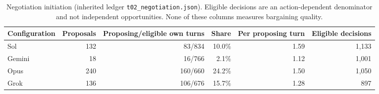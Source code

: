 \begin{table}[htbp]
\centering\small
\begin{tabular}{@{}lrrrrr@{}}\toprule
Configuration & Proposals & Proposing/eligible own turns & Share & Per proposing turn & Eligible decisions\\\midrule
Sol & 132 & 83/834 & 10.0\% & 1.59 & 1,133\\
Gemini & 18 & 16/766 & 2.1\% & 1.12 & 1,001\\
Opus & 240 & 160/660 & 24.2\% & 1.50 & 1,050\\
Grok & 136 & 106/676 & 15.7\% & 1.28 & 897\\
\bottomrule\end{tabular}
\caption{Negotiation initiation (inherited ledger \texttt{t02\_negotiation.json}). Eligible decisions are an action-dependent denominator and not independent opportunities. None of these columns measures bargaining quality.}
\label{tab:app-initiation}
\end{table}
